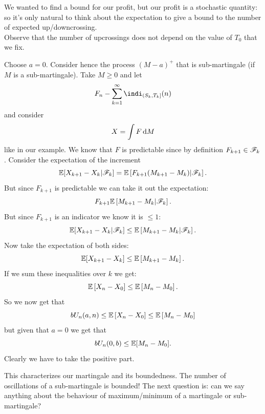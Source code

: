 \documentclass{report}
\begin{document}
We wanted to find a bound for our profit, but our profit is a stochastic quantity: so it's only natural to think about the expectation to give a bound to the number of expected up/downcrossing.\\
Observe that the number of upcrossings does not depend on the value of $T_0$ that we fix.
\begin{fancyproof}
	Choose $a=0$. Consider hence the process $(M-a)^{+}$ that is sub-martingale (if $M$ is a sub-martingale). Take $M\geq 0$ and let 
	\begin{equation*}
		F_{n}-\sum_{k=1}^{\infty}\indi_{(S_{k},T_{k}]}(n)
	\end{equation*}
	and consider 
	\begin{equation*}
		X=\int F\mathop{}\!\mathrm{d} M
	\end{equation*}
	like in our example. We know that $F$ is predictable since by definition $F_{k+1}\in\mathscr{F}_{k}$. Consider the expectation of the increment
	\begin{equation*}
		\mathbb{E}[X_{k+1}-X_{k}|\mathscr{F}_{k}]=\mathbb{E}\left[F_{k+1}(M_{k+1}-M_{k})|\mathscr{F}_{k}\right].
	\end{equation*}
	But since $F_{k+1}$ is predictable we can take it out the expectation:
	\begin{equation*}
		F_{k+1}\mathbb{E}\left[M_{k+1}-M_{k}|\mathscr{F}_{k}\right].
	\end{equation*}
	But since $F_{k+1}$ is an indicator we know it is $\leq1$:
	\begin{equation*}
			\mathbb{E}[X_{k+1}-X_{k}|\mathscr{F}_{k}]\leq\mathbb{E}\left[M_{k+1}-M_{k}|\mathscr{F}_{k}\right].
	\end{equation*}
	Now take the expectation of both sides:
	\begin{equation*}
		\mathbb{E}[X_{k+1}-X_{k}]\leq\mathbb{E}\left[M_{k+1}-M_{k}\right].
	\end{equation*}
	If we sum these inequalities over $k$ we get:
	\begin{equation*}
		\mathbb{E}\left[X_{n}-X_{0}\right]\leq\mathbb{E}\left[M_{n}-M_{0}\right].
	\end{equation*}
	So we now get that
	\begin{equation*}
		bU_{n}(a,n)\leq\mathbb{E}\left[X_{n}-X_{0}\right]\leq\mathbb{E}\left[M_{n}-M_{0}\right]
	\end{equation*}
	but given that $a=0$ we get that
	\begin{equation*}
		bU_{n}(0,b)\leq\mathbb{E}[M_{n}-M_{0}].
	\end{equation*}
	Clearly we have to take the positive part.
\end{fancyproof}
This characterizes our martingale and its boundedness. The number of oscillations of a sub-martingale is bounded! The next question is: can we say anything about the behaviour of maximum/minimum of a martingale or sub-martingale? 
\end{document}
